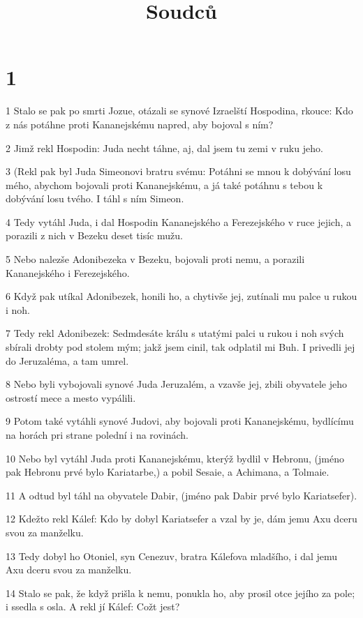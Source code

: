 

\title{Soudců}

\chapter{1}

\par 1 Stalo se pak po smrti Jozue, otázali se synové Izraelští Hospodina, rkouce: Kdo z nás potáhne proti Kananejskému napred, aby bojoval s ním?
\par 2 Jimž rekl Hospodin: Juda necht táhne, aj, dal jsem tu zemi v ruku jeho.
\par 3 (Rekl pak byl Juda Simeonovi bratru svému: Potáhni se mnou k dobývání losu mého, abychom bojovali proti Kananejskému, a já také potáhnu s tebou k dobývání losu tvého. I táhl s ním Simeon.
\par 4 Tedy vytáhl Juda, i dal Hospodin Kananejského a Ferezejského v ruce jejich, a porazili z nich v Bezeku deset tisíc mužu.
\par 5 Nebo nalezše Adonibezeka v Bezeku, bojovali proti nemu, a porazili Kananejského i Ferezejského.
\par 6 Když pak utíkal Adonibezek, honili ho, a chytivše jej, zutínali mu palce u rukou i noh.
\par 7 Tedy rekl Adonibezek: Sedmdesáte králu s utatými palci u rukou i noh svých sbírali drobty pod stolem mým; jakž jsem cinil, tak odplatil mi Buh. I privedli jej do Jeruzaléma, a tam umrel.
\par 8 Nebo byli vybojovali synové Juda Jeruzalém, a vzavše jej, zbili obyvatele jeho ostrostí mece a mesto vypálili.
\par 9 Potom také vytáhli synové Judovi, aby bojovali proti Kananejskému, bydlícímu na horách pri strane polední i na rovinách.
\par 10 Nebo byl vytáhl Juda proti Kananejskému, kterýž bydlil v Hebronu, (jméno pak Hebronu prvé bylo Kariatarbe,) a pobil Sesaie, a Achimana, a Tolmaie.
\par 11 A odtud byl táhl na obyvatele Dabir, (jméno pak Dabir prvé bylo Kariatsefer).
\par 12 Kdežto rekl Kálef: Kdo by dobyl Kariatsefer a vzal by je, dám jemu Axu dceru svou za manželku.
\par 13 Tedy dobyl ho Otoniel, syn Cenezuv, bratra Kálefova mladšího, i dal jemu Axu dceru svou za manželku.
\par 14 Stalo se pak, že když prišla k nemu, ponukla ho, aby prosil otce jejího za pole; i ssedla s osla. A rekl jí Kálef: Cožt jest?
